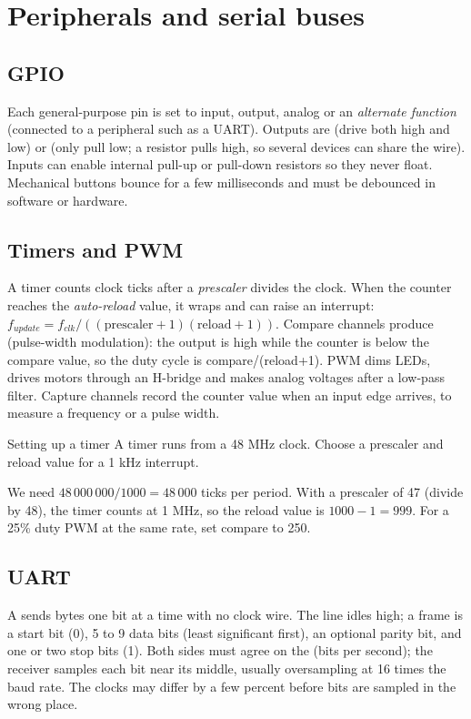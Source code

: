 \section{Peripherals and serial buses}

\subsection*{GPIO}

Each general-purpose pin is set to input, output, analog or an \emph{alternate function} (connected to a peripheral such as a UART). Outputs are  (drive both high and low) or  (only pull low; a resistor pulls high, so several devices can share the wire). Inputs can enable internal pull-up or pull-down resistors so they never float. Mechanical buttons bounce for a few milliseconds and must be debounced in software or hardware.

\subsection*{Timers and PWM}

A timer counts clock ticks after a \emph{prescaler} divides the clock. When the counter reaches the \emph{auto-reload} value, it wraps and can raise an interrupt: $f_{update} = f_{clk} / ((\text{prescaler}+1)(\text{reload}+1))$. Compare channels produce  (pulse-width modulation): the output is high while the counter is below the compare value, so the duty cycle is compare/(reload+1). PWM dims LEDs, drives motors through an H-bridge and makes analog voltages after a low-pass filter. Capture channels record the counter value when an input edge arrives, to measure a frequency or a pulse width.

\begin{worked}{Setting up a timer}
A timer runs from a 48 MHz clock. Choose a prescaler and reload value for a 1 kHz interrupt.

We need $48\,000\,000 / 1000 = 48\,000$ ticks per period. With a prescaler of 47 (divide by 48), the timer counts at 1 MHz, so the reload value is $1000 - 1 = 999$. For a 25\% duty PWM at the same rate, set compare to 250.
\end{worked}

\subsection*{UART}

A  sends bytes one bit at a time with no clock wire. The line idles high; a frame is a start bit (0), 5 to 9 data bits (least significant first), an optional parity bit, and one or two stop bits (1). Both sides must agree on the  (bits per second); the receiver samples each bit near its middle, usually oversampling at 16 times the baud rate. The clocks may differ by a few percent before bits are sampled in the wrong place.


